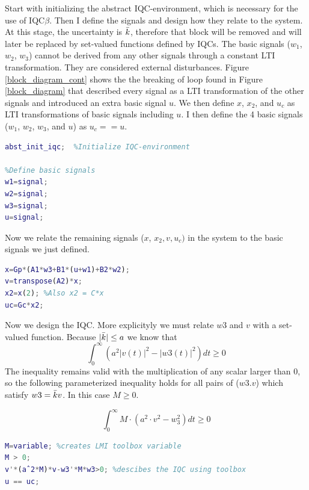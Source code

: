 \documentclass{article}[12pt]
\begin{document}
Start with initializing the abstract IQC-environment, which is necessary for the use of IQC$\beta$. Then I define the signals and design how they relate to the system. At this stage, the uncertainty is $\Bar{k}$, therefore that block will be removed and will later be replaced by set-valued functions defined by IQCs. The basic signals ($w_1$, $w_2$, $w_3$) cannot be derived from any other signals through a constant LTI transformation. They are considered external disturbances. Figure \ref{block_diagram_cont} shows the the breaking of loop found in Figure \ref{block_diagram} that described every signal as a LTI transformation of the other signals and introduced an extra basic signal $u$. We then define $x$, $x_2$, and $u_c$ as LTI transformations of basic signals including $u$. I then define the 4 basic signals ($w_1$, $w_2$, $w_3$, and $u$) as $u_c == u$. 

\begin{lstlisting}[language=MatLab]
abst_init_iqc;  %Initialize IQC-environment

%Define basic signals
w1=signal;
w2=signal;
w3=signal;
u=signal;

\end{lstlisting}

\noindent Now we relate the remaining signals ($x$, $x_2, v, u_c)$ in the system to the basic signals we just defined.

\begin{lstlisting}[language=MatLab]
%Relate basic signals to the remaining signals
x=Gp*(A1*w3+B1*(u+w1)+B2*w2);
v=transpose(A2)*x;
x2=x(2); %Also x2 = C*x
uc=Gc*x2;

\end{lstlisting}

\noindent Now we design the IQC. More explicityly we must relate $w3$ and $v$ with a set-valued function. Because $|\Bar{k}| \leq a$ we know that 
\begin{equation*}
    \int^\infty_0 (a^2 |v(t)|^2 - |w3(t)|^2)dt \geq 0
\end{equation*}
The inequality remains valid with the multiplication of any scalar larger than 0, so the following parameterized inequality holds for all pairs of ($w3. v$) which satisfy $w3 = \Bar{k}v$. In this case $M \geq 0$.

\begin{equation*}
    \int^\infty_0 M \cdot (a^2 \cdot v^2 - w_3^2)dt \geq 0
\end{equation*}

\begin{lstlisting}[language=MatLab]
%Define IQC
M=variable; %creates LMI toolbox variable 
M > 0;
v'*(aˆ2*M)*v-w3'*M*w3>0; %descibes the IQC using toolbox
u == uc;
\end{lstlisting}
\end{document}
